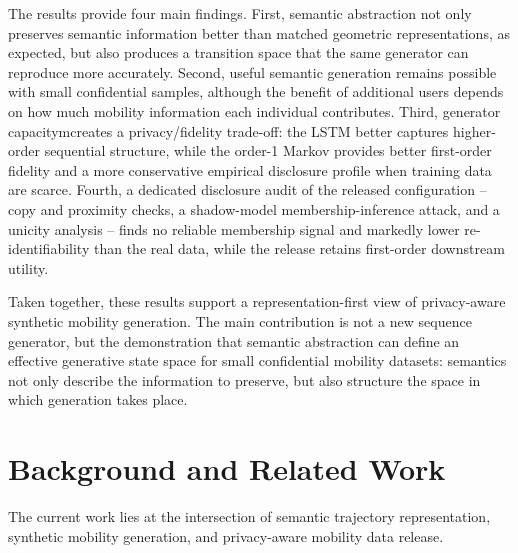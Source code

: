 \documentclass[sigconf,nonacm]{acmart}
\begin{document}
The results provide four main findings. First, semantic abstraction not only preserves semantic information better than matched geometric representations, as expected, but also produces a transition space that the same generator can reproduce more accurately. Second, useful semantic generation remains possible with small confidential samples,
although the benefit of additional users depends on how much mobility information each individual contributes. Third, generator capacitymcreates a privacy/fidelity trade-off: the LSTM better captures higher-order sequential structure, while the order-1 Markov provides better first-order fidelity and a more conservative empirical disclosure profile when training data are scarce. Fourth, a dedicated disclosure audit of the released configuration -- copy and proximity checks, a shadow-model membership-inference attack, and a unicity analysis -- finds no reliable membership signal and markedly lower re-identifiability than the real data, while the release retains first-order downstream utility.

Taken together, these results support a representation-first view of privacy-aware synthetic mobility generation. The main contribution is not a new sequence generator, but the demonstration that semantic
abstraction can define an effective generative state space for small confidential mobility datasets: semantics not only describe the information to preserve, but also structure the space in which  generation takes place.


\section{Background and Related Work}

The current work lies at the intersection of semantic trajectory
representation, synthetic mobility generation, and privacy-aware
mobility data release.
\end{document}
